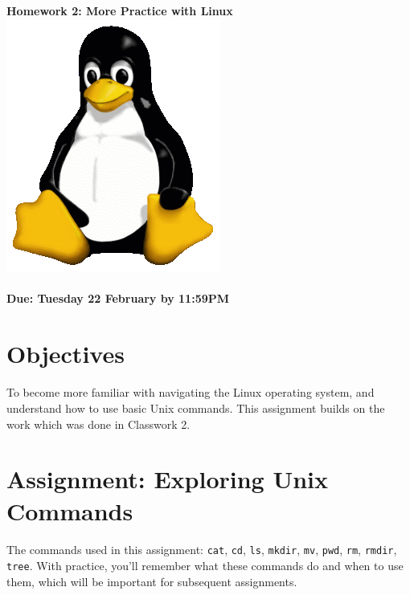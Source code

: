 \documentclass[letter,11pt]{article}
\begin{document}
\huge
\textbf{Homework 2: More Practice with Linux} \includegraphics[scale=0.07]{Images/Tux.png}
\normalsize
\\ ~~ \\
\textbf{Due: Tuesday 22 February by 11:59PM}

\section*{Objectives}
\paragraph{}To become more familiar with navigating the Linux operating system, and understand how to use basic Unix commands. This assignment builds on the work which was done in Classwork 2.

\section*{Assignment: Exploring Unix Commands}
\paragraph{}The commands used in this assignment: \texttt{cat}, \texttt{cd}, \texttt{ls}, \texttt{mkdir}, \texttt{mv}, \texttt{pwd}, \texttt{rm}, \texttt{rmdir}, \texttt{tree}. With practice, you'll remember what these commands do and when to use them, which will be important for subsequent assignments.
\end{document}
